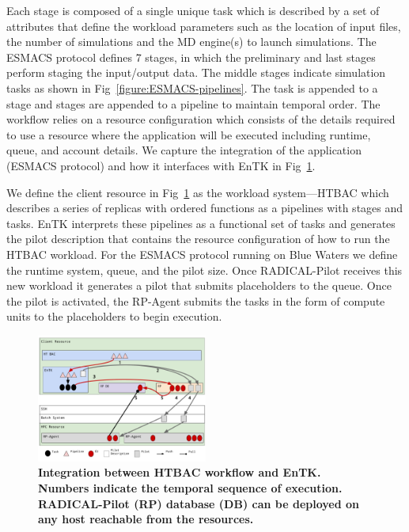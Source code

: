 
Each stage is composed of a single unique task which is described by a set of
attributes that define the workload parameters such as the location of input
files, the number of simulations and the MD engine(s) to launch simulations.
The ESMACS protocol defines 7 stages, in which the preliminary and last
stages perform staging the input/output data. The middle stages indicate
simulation tasks as shown in Fig~\ref{figure:ESMACS-pipelines}. The task is
appended to a stage and stages are appended to a pipeline to maintain
temporal order. The workflow relies on a resource configuration which
consists of the details required to use a resource where the application will
be executed including runtime, queue, and account details. We capture the
integration of the application (ESMACS protocol) and how it interfaces with
EnTK in Fig~\ref{figure:ht-bac_rp}.

We define the client resource in Fig~\ref{figure:ht-bac_rp} as the workload
system---HTBAC which describes a series of replicas with ordered functions as
a pipelines with stages and tasks. EnTK interprets these pipelines as a
functional set of tasks and generates the pilot description that contains the
resource configuration of how to run the HTBAC workload. For the ESMACS
protocol running on Blue Waters we define the runtime system, queue, and the
pilot size. Once RADICAL-Pilot receives this new workload it generates a
pilot that submits placeholders to the queue. Once the pilot is activated,
the RP-Agent submits the tasks in the form of compute units to the
placeholders to begin execution.

\begin{figure}
\centering
  \includegraphics[width=0.5\textwidth]{FIGURES/ht-bac-rp_integration.pdf}
  \caption{\bf Integration between HTBAC workflow and EnTK\@. Numbers
  indicate the temporal sequence of execution. RADICAL-Pilot (RP) database
  (DB) can be deployed on any host reachable from the
  resources.}\label{figure:ht-bac_rp}
\end{figure}

